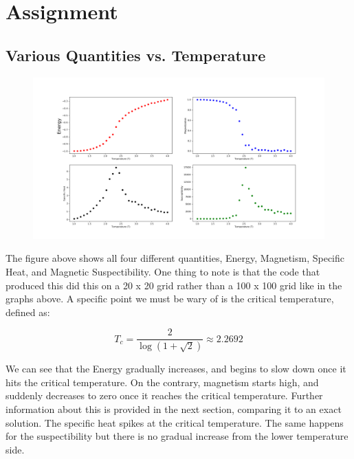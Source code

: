 \documentclass[12pt]{article}
\begin{document}
\section{Assignment}

\subsection*{Various Quantities vs. Temperature}

\begin{figure}[H]
\begin{center}
\includegraphics[width=\textwidth]{quants.png}
\end{center}
\end{figure}

The figure above shows all four different quantities, Energy, Magnetism, Specific Heat, and Magnetic Suspectibility. One thing to note is that the code that produced this did this on a 20 x 20 grid rather than a 100 x 100 grid like in the graphs above. A specific point we must be wary of is the critical temperature, defined as:

\begin{equation}
T_c = \frac{2}{\log \left( 1+\sqrt{2} \right) } \approx 2.2692
\end{equation}

We can see that the Energy gradually increases, and begins to slow down once it hits the critical temperature. On the contrary, magnetism starts high, and suddenly decreases to zero once it reaches the critical temperature. Further information about this is provided in the next section, comparing it to an exact solution. The specific heat spikes at the critical temperature. The same happens for the suspectibility but there is no gradual increase from the lower temperature side.
\end{document}
